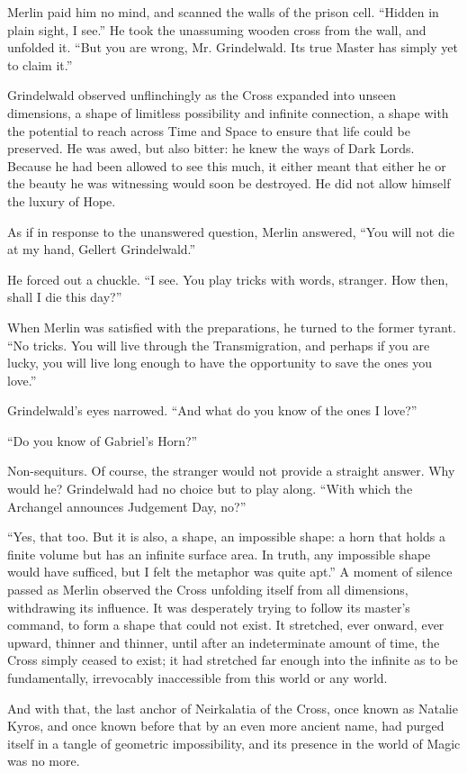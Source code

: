 Merlin paid him no mind, and scanned the walls of the prison cell. “Hidden in plain sight, I see.” He took the unassuming wooden cross from the wall, and unfolded it. “But you are wrong, Mr. Grindelwald. Its true Master has simply yet to claim it.”

Grindelwald observed unflinchingly as the Cross expanded into unseen dimensions, a shape of limitless possibility and infinite connection, a shape with the potential to reach across Time and Space to ensure that life could be preserved. He was awed, but also bitter: he knew the ways of Dark Lords. Because he had been allowed to see this much, it either meant that either he or the beauty he was witnessing would soon be destroyed. He did not allow himself the luxury of Hope.

As if in response to the unanswered question, Merlin answered, “You will not die at my hand, Gellert Grindelwald.”

He forced out a chuckle. “I see. You play tricks with words, stranger. How then, shall I die this day?”

When Merlin was satisfied with the preparations, he turned to the former tyrant. “No tricks. You will live through the Transmigration, and perhaps if you are lucky, you will live long enough to have the opportunity to save the ones you love.”

Grindelwald’s eyes narrowed. “And what do you know of the ones I love?”

“Do you know of Gabriel’s Horn?”

Non-sequiturs. Of course, the stranger would not provide a straight answer. Why would he? Grindelwald had no choice but to play along. “With which the Archangel announces Judgement Day, no?”

“Yes, that too. But it is also, a shape, an impossible shape: a horn that holds a finite volume but has an infinite surface area. In truth, any impossible shape would have sufficed, but I felt the metaphor was quite apt.” A moment of silence passed as Merlin observed the Cross unfolding itself from all dimensions, withdrawing its influence. It was desperately trying to follow its master’s command, to form a shape that could not exist. It stretched, ever onward, ever upward, thinner and thinner, until after an indeterminate amount of time, the Cross simply ceased to exist; it had stretched far enough into the infinite as to be fundamentally, irrevocably inaccessible from this world or any world.

And with that, the last anchor of Neirkalatia of the Cross, once known as Natalie Kyros, and once known before that by an even more ancient name, had purged itself in a tangle of geometric impossibility, and its presence in the world of Magic was no more.
\simpleline
{}

